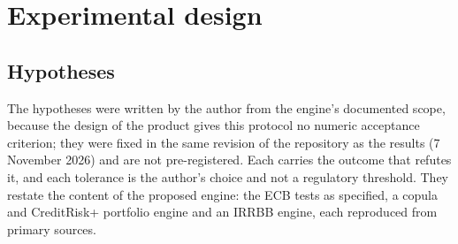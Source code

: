 \section{Experimental design}
\label{sec:experimental-design}

\subsection{Hypotheses}

The hypotheses were written by the author from the engine's documented scope, because the design of the product gives this protocol no numeric acceptance criterion; they were fixed in the same revision of the repository as the results (7 November 2026) and are not pre-registered. Each carries the outcome that refutes it, and each tolerance is the author's choice and not a regulatory threshold. They restate the content of the proposed engine: the ECB tests as specified, a copula and CreditRisk+ portfolio engine and an IRRBB engine, each reproduced from primary sources.
